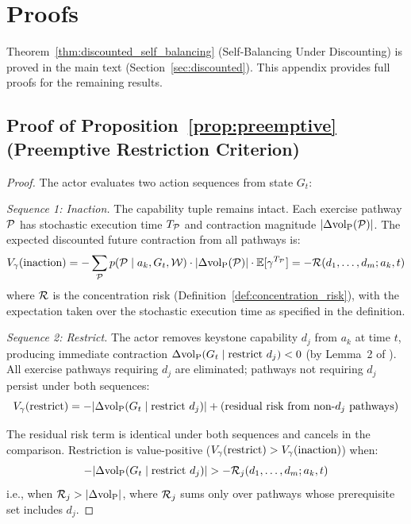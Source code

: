 \section{Proofs}
\label{app:proofs}

Theorem~\ref{thm:discounted_self_balancing} (Self-Balancing Under Discounting)
is proved in the main text (Section~\ref{sec:discounted}). This appendix
provides full proofs for the remaining results.

\subsection{Proof of Proposition~\ref{prop:preemptive} (Preemptive Restriction Criterion)}
\label{app:proof_preemptive}

\begin{proof}
The actor evaluates two action sequences from state $G_t$:

\emph{Sequence 1: Inaction.} The capability tuple remains intact. Each
exercise pathway $\mathcal{P}$ has stochastic execution time $T_{\mathcal{P}}$ and
contraction magnitude $|\Delta {\operatorname{vol}_{\mathrm{P}}}(\mathcal{P})|$. The expected discounted
future contraction from all pathways is:
\[
V_\gamma(\text{inaction}) = -\sum_{\mathcal{P}}
    p(\mathcal{P} \mid a_k, G_t, \mathcal{W}) \cdot
    |\Delta {\operatorname{vol}_{\mathrm{P}}}(\mathcal{P})| \cdot \mathbb{E}[\gamma^{T_{\mathcal{P}}}]
    = -\mathcal{R}(d_1, \ldots, d_m; a_k, t)
\]
where $\mathcal{R}$ is the concentration risk
(Definition~\ref{def:concentration_risk}), with the expectation taken over
the stochastic execution time as specified in the definition.

\emph{Sequence 2: Restrict.} The actor removes keystone capability $d_j$
from $a_k$ at time $t$, producing immediate contraction
$\Delta {\operatorname{vol}_{\mathrm{P}}}(G_t \mid \text{restrict } d_j) < 0$ (by Lemma~2 of
\citet{lasser2026gfm}). All exercise pathways requiring $d_j$ are
eliminated; pathways not requiring $d_j$ persist under both sequences:
\[
V_\gamma(\text{restrict}) =
    -|\Delta {\operatorname{vol}_{\mathrm{P}}}(G_t \mid \text{restrict } d_j)|
    + \text{(residual risk from non-}d_j\text{ pathways)}
\]

The residual risk term is identical under both sequences and cancels
in the comparison.  Restriction is value-positive
($V_\gamma(\text{restrict}) > V_\gamma(\text{inaction})$) when:
\[
-|\Delta {\operatorname{vol}_{\mathrm{P}}}(G_t \mid \text{restrict } d_j)| >
-\mathcal{R}_j(d_1, \ldots, d_m; a_k, t)
\]
i.e., when $\mathcal{R}_j > |\Delta {\operatorname{vol}_{\mathrm{P}}}|$, where $\mathcal{R}_j$ sums only over
pathways whose prerequisite set includes $d_j$.
\end{proof}

